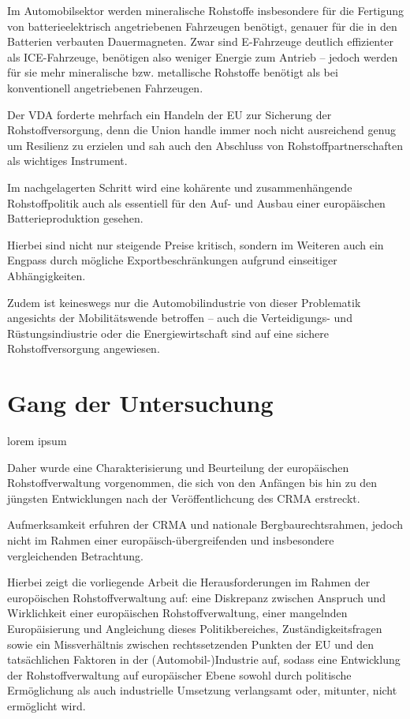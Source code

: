 \documentclass[12pt,a4paper,oneside]{book} %
\begin{document}
Im Automobilsektor werden mineralische Rohstoffe insbesondere für die Fertigung von batterieelektrisch angetriebenen Fahrzeugen benötigt, genauer für die in den Batterien verbauten Dauermagneten. Zwar sind E-Fahrzeuge deutlich effizienter als ICE-Fahrzeuge, benötigen also weniger Energie zum Antrieb -- jedoch werden für sie mehr mineralische bzw. metallische Rohstoffe benötigt als bei konventionell angetriebenen Fahrzeugen.

Der VDA forderte mehrfach ein Handeln der EU zur Sicherung der Rohstoffversorgung, denn die Union handle immer noch nicht ausreichend genug um Resilienz zu erzielen und sah auch den Abschluss von Rohstoffpartnerschaften als wichtiges Instrument.\autocite{Horizont  36-37 vom 04.09.2025  Seite 030 }

Im nachgelagerten Schritt wird eine kohärente und zusammenhängende Rohstoffpolitik auch als essentiell für den Auf- und Ausbau einer europäischen Batterieproduktion gesehen.\autocite{bibid}

Hierbei sind nicht nur steigende Preise kritisch, sondern im Weiteren auch ein Engpass durch mögliche Exportbeschränkungen aufgrund einseitiger Abhängigkeiten.

Zudem ist keineswegs nur die Automobilindustrie von dieser Problematik angesichts der Mobilitätswende betroffen -- auch die Verteidigungs- und Rüstungsindiustrie oder die Energiewirtschaft sind auf eine sichere Rohstoffversorgung angewiesen.

\section{Gang der Untersuchung}
lorem ipsum

Daher wurde eine Charakterisierung und Beurteilung der europäischen Rohstoffverwaltung vorgenommen, die sich von den Anfängen bis hin zu den jüngsten Entwicklungen nach der Veröffentlichcung des CRMA erstreckt. 

Aufmerksamkeit erfuhren der CRMA und nationale Bergbaurechtsrahmen, jedoch nicht im Rahmen einer europäisch-übergreifenden und insbesondere vergleichenden Betrachtung.

Hierbei zeigt die vorliegende Arbeit die Herausforderungen im Rahmen der europöischen Rohstoffverwaltung auf: eine Diskrepanz zwischen Anspruch und Wirklichkeit einer europäischen Rohstoffverwaltung, einer mangelnden Europäisierung und Angleichung dieses Politikbereiches, Zuständigkeitsfragen sowie ein Missverhältnis zwischen rechtssetzenden Punkten der EU und den tatsächlichen Faktoren in der (Automobil-)Industrie auf, sodass eine Entwicklung der Rohstoffverwaltung auf europäischer Ebene sowohl durch politische Ermöglichung als auch industrielle Umsetzung verlangsamt oder, mitunter, nicht ermöglicht wird.
\end{document}
